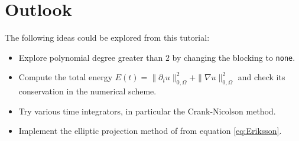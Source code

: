 \documentclass[a4paper,12pt]{article}
\theoremstyle{definition}
\theoremstyle{definition}
\begin{document}
\section{Outlook}

The following ideas could be explored from this tutorial:
\begin{itemize}
\item Explore polynomial degree greater than $2$ by changing the blocking
to \lstinline{none}.
\item Compute the total energy $E(t) = \|\partial_t u\|_{0,\Omega}^2 +
  \|\nabla u\|_{0,\Omega}^2$ and check its conservation in
the numerical scheme.
\item Try various time integrators, in particular the Crank-Nicolson method.
\item Implement the elliptic projection method of \cite{Eriksson} from
equation \eqref{eq:Eriksson}.
\end{itemize}



\end{document}
